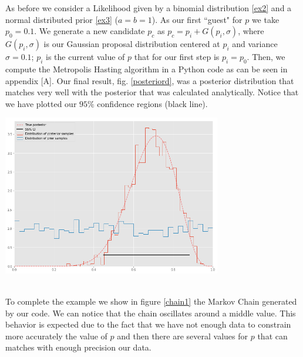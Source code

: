 \documentclass[onecolumn,           %
               showpacs,            %
               preprintnumbers,     %
               aps,                 %
               prl,          	    %
               letterpaper,             %
               superscriptaddress,      %
               nofootinbib,         %
               tightenlines,        %
               floats,floatfix      %
               ,usenatbib,
               ]{revtex4-1}
\begin{document}
As before we consider a Likelihood given by a binomial distribution \eqref{ex2} and a normal distributed prior \eqref{ex3} ($a=b=1$). As our first ``guest" for $p$ we take $p_0=0.1$. We generate a new candidate $p_c$ as $p_c=p_i+G(p_i,\sigma)$, where $G(p_i,\sigma)$ is our Gaussian proposal distribution centered at $p_i$ and variance $\sigma=0.1$; $p_i$ is the current value of $p$ that for our first step is $p_i=p_0$. Then, we compute the Metropolis Hasting algorithm in a Python code as can be seen in appendix [A]. Our final result,  fig. \ref{posteriord}, was a posterior distribution that matches very well with the posterior that was calculated analytically. Notice that we have plotted our $95\%$ confidence regions (black line). 

\begin{minipage}{\textwidth}
\centering

\includegraphics[height=7cm]{posterior.png}
\label{posteriord}
\end{minipage}\\

To complete the example we show in figure \ref{chain1} the Markov Chain generated by our code. We can notice that the chain oscillates around a middle value. This behavior is expected due to the fact that we have not enough data to constrain more accurately the value of $p$ and then there are several values for $p$ that can matches with enough precision our data.   
\end{document}
